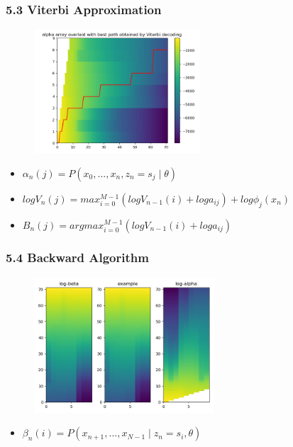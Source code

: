\documentclass[t]{beamer}
\begin{document}
\begin{frame}
	\frametitle{5.3 Viterbi Approximation}
	\begin{figure}
\centering
		\includegraphics[width=0.55\textwidth]{figures/53.png}
	\end{figure}

	\begin{itemize}
		\item $\alpha_n(j) = P(x_0, ..., x_n, z_n =s_j \mid \theta)$
		\item $log V_n(j) = max^{M-1}_{i=0}(log V_{n-1}(i) + log a_{ij}) + log \phi_j(x_n)$
		\item $B_n(j) = argmax_{i=0}^{M-1}(log V_{n-1}(i) + log a_{ij})$
		

	\end{itemize}

	
\end{frame}
	
\begin{frame}
	\frametitle{5.4 Backward Algorithm}
	\begin{figure}
		\includegraphics[width=0.6\textwidth]{figures/54.png}
	\end{figure}
 
\begin{itemize}
\item $\beta_n(i) = P(x_{n+1}, ..., x_{N-1} \mid z_n = s_i, \theta)$
\end{itemize}

\end{frame}
	
\end{document}
